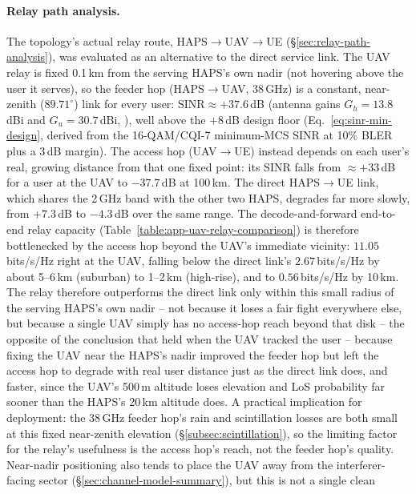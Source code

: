 \documentclass[conference]{IEEEtran}
\begin{document}
\paragraph{Relay path analysis.} The topology's actual relay route,
HAPS$\rightarrow$UAV$\rightarrow$UE (\S\ref{sec:relay-path-analysis}), was
evaluated as an alternative to the direct service link. The UAV relay is fixed 0.1\,km from
the serving HAPS's own nadir (not hovering above the user it serves), so the feeder hop
(HAPS$\rightarrow$UAV, 38\,GHz) is a constant, near-zenith ($89.71^\circ$) link for every
user: $\mathrm{SINR}\approx+37.6$\,dB (antenna gains $G_h=13.8$\,dBi and $G_u=30.7$\,dBi,
\cite{karaman2025haps,anim2021uav}), well above the
$+8$\,dB design floor (Eq.~\eqref{eq:sinr-min-design}, derived from the 16-QAM/CQI-7 minimum-MCS SINR at 10\% BLER~\cite{3gpp_ts38214}
plus a 3\,dB margin). The access hop (UAV$\rightarrow$UE) instead depends on each user's
real, growing distance from that one fixed point: its SINR falls from $\approx+33$\,dB for a
user at the UAV to $-37.7$\,dB at 100\,km. The direct HAPS$\rightarrow$UE link, which shares
the 2\,GHz band with the other two HAPS, degrades far more slowly, from
$+7.3$\,dB to $-4.3$\,dB over the same range. The decode-and-forward end-to-end relay
capacity (Table~\ref{table:app-uav-relay-comparison}) is therefore bottlenecked by the access hop beyond the UAV's immediate vicinity:
$11.05$\,bits/s/Hz right at the UAV, falling below the direct link's $2.67$\,bits/s/Hz by
about 5--6\,km (suburban) to 1--2\,km (high-rise), and to $0.56$\,bits/s/Hz by 10\,km. The
relay therefore outperforms the direct link only within this small radius of the serving
HAPS's own nadir -- not because it loses a fair fight everywhere else, but because a single
UAV simply has no access-hop reach beyond that disk -- the opposite of the conclusion that
held when the UAV tracked the
user -- because fixing the UAV near the HAPS's nadir improved the feeder hop but left the
access hop to degrade with real user distance just as the direct link does, and faster,
since the UAV's 500\,m altitude loses elevation and LoS probability far sooner than the
HAPS's 20\,km altitude does. A practical implication for
deployment: the 38\,GHz feeder hop's rain and scintillation losses are both small at this
fixed near-zenith elevation (\S\ref{subsec:scintillation}), so the limiting factor for the
relay's usefulness is the access hop's reach, not the feeder hop's quality. Near-nadir
positioning also tends to place the UAV away from the interferer-facing
sector (\S\ref{sec:channel-model-summary}), but this is not a single clean
\end{document}

